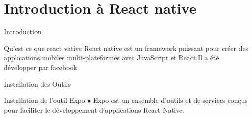 \documentclass[5pt]{beamer}
\begin{document}
{











\section{Introduction à React native}
\begin{frame}[fragile]{Introduction}
\begin{block}{Qu'est ce que react vative}
React native est un framework puissant pour créer des applications
mobiles multi-plateformes avec JavaScript et React.Il a été
développer par facebook 
	\end{block}
\end{frame}
\begin{frame}[fragile]{Installation des Outils}
\begin{block}{Installation de l’outil Expo}
$ \bullet $ Expo est un ensemble d’outils et de services conçus pour
faciliter le développement d’applications React Native.


\end{block}
\end{frame}}
\end{document}
